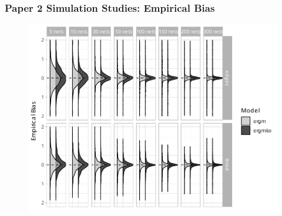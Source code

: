 \documentclass[aspectratio=169, 9pt]{beamer}\usepackage[]{graphicx}\usepackage[]{color}
\begin{document}
\begin{frame}
\frametitle{Paper 2 Simulation Studies: Empirical Bias}

\begin{figure}
\centering
\includegraphics[width=.6\linewidth]{bias-02-various-sizes-4-5-ttriad.pdf}
\end{figure}

\vfill\hfill \hyperlink{ergmitoexperiment}{}

\end{frame}
\end{document}
